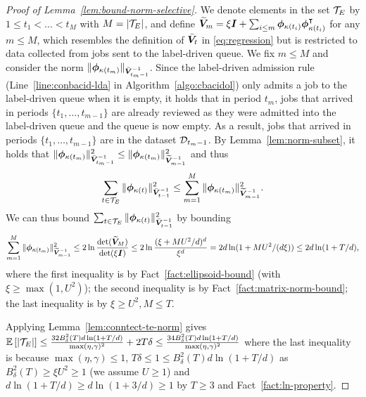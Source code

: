 \begin{proof}[Proof of Lemma~\ref{lem:bound-norm-selective}]
We denote elements in the set $\mathcal{T}_E$ by $1 \leq t_1 < \ldots < t_M$ with $M = |\mathcal{T}_E|$, and define $\widetilde{\boldsymbol{V}}_m = \xi \boldsymbol{I} + \sum_{i \leq m} \boldsymbol{\phi}_{\kappa(t_i)}\boldsymbol{\phi}^{\intercal}_{\kappa(t_i)}$ for any $m \leq M$, which resembles the definition of $\bar{\boldsymbol{V}}_t$ in \eqref{eq:regression} but is restricted to data collected from jobs sent to the label-driven queue. We fix $m \leq M$ and consider the norm $\|\boldsymbol{\phi}_{\kappa(t_m)}\|_{\bar{\boldsymbol{V}}_{t_m-1}^{-1}}$. Since the label-driven admission rule (Line~\ref{line:conbacid-lda} in Algorithm~\ref{algo:cbacidol}) only admits a job to the label-driven queue when it is empty, it holds that in period $t_m$, jobs that arrived in periods $\{t_1,\ldots,t_{m-1}\}$ are already reviewed as they were admitted into the label-driven queue and the queue is now empty. As a result, jobs that arrived in periods $\{t_1,\ldots,t_{m-1}\}$ are in the dataset $\mathcal{D}_{t_{m} - 1}$. By Lemma~\ref{lem:norm-subset}, it holds that $\|\boldsymbol{\phi}_{\kappa(t_m)}\|_{\bar{\boldsymbol{V}}_{t_m-1}^{-1}}^2 \leq \|\boldsymbol{\phi}_{\kappa(t_m)}\|_{\widetilde{\boldsymbol{V}}_{m-1}^{-1}}^2$ and thus
\[
\sum_{t \in \mathcal{T}_E} \|\boldsymbol{\phi}_{\kappa(t)}\|_{\bar{\boldsymbol{V}}_{t-1}^{-1}}^2 \leq \sum_{m=1}^M \|\boldsymbol{\phi}_{\kappa(t_m)}\|_{\widetilde{\boldsymbol{V}}_{m-1}^{-1}}^2. 
\]
We can thus bound $\sum_{t \in \mathcal{T}_E} \|\boldsymbol{\phi}_{\kappa(t)}\|_{\bar{\boldsymbol{V}}_{t-1}^{-1}}^2$ by bounding
\[
\sum_{m=1}^M \|\boldsymbol{\phi}_{\kappa(t_m)}\|_{\widetilde{\boldsymbol{V}}_{m-1}^{-1}}^2 \leq 2\ln \frac{\mathrm{det}(\widetilde{\boldsymbol{V}}_M)}{\mathrm{det}(\xi \boldsymbol{I})} \leq 2\ln\frac{(\xi + MU^2/d)^d}{\xi^d} = 2d\ln(1+MU^2/(d\xi))\leq 2d\ln(1+T/d),
\]
where the first inequality is by Fact~\ref{fact:ellipsoid-bound} (with $\xi \geq \max(1,U^2)$); the second inequality is by Fact~\ref{fact:matrix-norm-bound}; the last inequality is by $\xi \geq U^2, M \leq T$. 

Applying Lemma~\ref{lem:conntect-te-norm} gives $\mathbb E\left[|\mathcal{T}_E|\right] \leq \frac{32B_{\delta}^2(T)d\ln(1+T/d)}{\max(\eta,\gamma)^2} + 2T\delta \leq \frac{34B_{\delta}^2(T)d\ln(1+T/d)}{\max(\eta,\gamma)^2}$ where the last inequality is because $\max(\eta,\gamma) \leq 1$, $T\delta \leq 1 \leq B_{\delta}^2(T)d\ln(1+T/d)$ as $B_{\delta}^2(T) \geq \xi U^2 \geq 1$ (we assume $U \geq 1$) and $d\ln(1+T/d) \geq d\ln(1+3/d) \geq 1$ by $T \geq 3$ and Fact~\ref{fact:ln-property}.
\end{proof}

